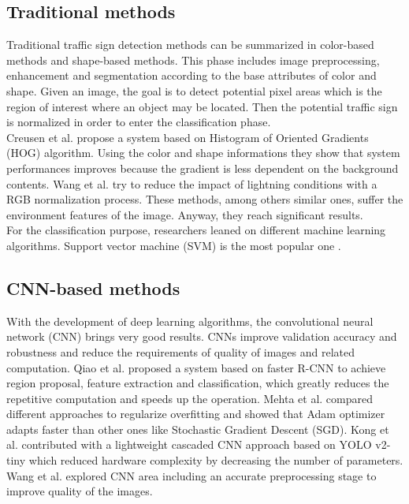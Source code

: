 \documentclass[10pt,twocolumn,letterpaper]{article}
\begin{document}
\subsection{Traditional methods}
Traditional traffic sign detection methods can be summarized in color-based methods and shape-based methods. This phase includes image preprocessing, enhancement and segmentation according to the base attributes of color and shape. Given an image, the goal is to detect potential pixel areas which is the region of interest where an object may be located. Then the potential traffic sign is normalized in order to enter the classification phase.\\
Creusen et al. \cite{CreusenHog} propose a system based on Histogram of Oriented Gradients (HOG) algorithm. Using the color and shape informations they show that system performances improves because the gradient is less dependent on the background contents. Wang et al. \cite{WangRGB} try to reduce the impact of lightning conditions with a RGB normalization process. These methods, among others similar ones, suffer the environment features of the image. Anyway, they reach significant results.\\
For the classification purpose, researchers leaned on different machine learning algorithms. Support vector machine (SVM) is the most popular one \cite{soendoroSVM, greenSVM, rashidSVM}.

\subsection{CNN-based methods}
With the development of deep learning algorithms, the convolutional neural network (CNN) brings very good results. CNNs improve validation accuracy and robustness and reduce the requirements of quality of images and related computation. Qiao et al. \cite{qiaoCNN} proposed a system based on faster R-CNN to achieve region proposal, feature extraction and classification, which greatly reduces the repetitive computation and speeds up the operation. Mehta et al. \cite{mehtaCNN} compared different approaches to regularize overfitting and showed that Adam optimizer adapts faster than other ones like Stochastic Gradient Descent (SGD). Kong et al. \cite{kongCNN} contributed with a lightweight cascaded CNN approach based on YOLO v2-tiny which reduced hardware complexity by decreasing the number of parameters.
Wang et al. \cite{wangCNN} explored CNN area including an accurate preprocessing stage to improve quality of the images.
\end{document}
